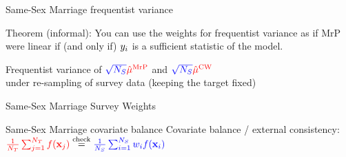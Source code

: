 






\begin{frame}[t]{Same-Sex Marriage frequentist variance}

\centering

\begin{block}{Theorem \parencite{giordano:2026:mrplew} (informal):}
You can use the weights for frequentist variance as if MrP were linear
if (and only if) $\y_i$ is a sufficient statistic of the model.
\end{block}

Frequentist variance of $\tarcol{\surcol{\sqrt{\Nsur}} \muhat[\mrp]}$ and %
$\tarcol{\surcol{\sqrt{\Nsur}} \muhat[\cal]}$\\
under re-sampling of survey data (keeping the target fixed)

\begin{minipage}{0.9\textwidth}
    \centering
\end{minipage}


\end{frame}






\begin{frame}{Same-Sex Marriage Survey Weights}


\centering

\begin{minipage}{0.7\textwidth}
\WeightsBivPlotLax{}
\end{minipage}



\end{frame}






\begin{frame}{Same-Sex Marriage covariate balance}
\centering
Covariate balance / external consistency:
$\tarcol{\meantar \f(\x_j)} \eqcheck \surcol{\meansur \w_i \f(\x_i)}$\\[1em]
\begin{minipage}{0.9\textwidth}
    \centering
\LaxphilipsBalanceInteractions{}        
\end{minipage}

\end{frame}
